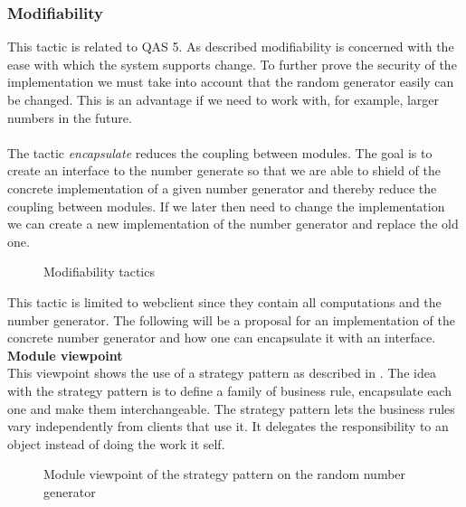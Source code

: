 \subsubsection{Modifiability} \label{sec:modifiability_random_generator}
This tactic is related to QAS 5.  As described modifiability is concerned with the ease with which the system supports change. To further prove the security of the implementation we must take into account that the random generator easily can be changed. This is an advantage if we need to work with, for example, larger numbers in the future. \\ \\ The tactic \textit{encapsulate} reduces the coupling between modules. The goal is to create an interface to the number generate so that we are able to shield of the concrete implementation of a given number generator and thereby reduce the coupling between modules. If  we later then need to change the implementation we can create a new implementation of the number generator and  replace the old one. 



\begin{figure}[H]
\centering
  \caption{Modifiability tactics \cite{Bass}}   
\end{figure}

\noindent
This tactic is limited to webclient since they contain all computations and the number generator. The following will be a proposal for an implementation of the concrete number generator and how one can encapsulate it with an interface.\\


\noindent
\textbf{Module viewpoint}\\
This viewpoint shows the use of a strategy pattern as described in \cite{Baerbak10}. The idea with the strategy pattern is to define a family of business rule, encapsulate each one and make them interchangeable. The strategy pattern lets the business rules vary independently from clients that use it. It delegates the responsibility to an object instead of doing the work it self. 



\begin{figure}[H]
\centering
  \caption{Module viewpoint of the strategy pattern on the random number generator} 
  \label{fig:the_random_number_generator}
\end{figure}


